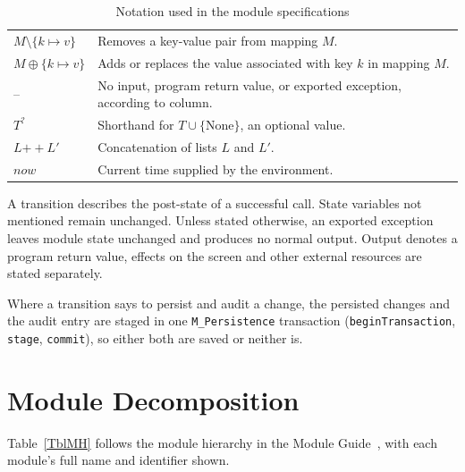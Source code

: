 \documentclass[12pt, titlepage]{article}
\begin{document}
\begin{table}[H]
\begin{tabularx}{\textwidth}{l X}
$M\setminus\{k\mapsto v\}$ & Removes a key-value pair from mapping $M$. \\
$M\oplus\{k\mapsto v\}$ & Adds or replaces the value associated with key $k$ in mapping $M$. \\
-- & No input, program return value, or exported exception, according to column. \\
$T^{?}$ & Shorthand for $T\cup\{\text{None}\}$, an optional value. \\
$L \mathbin{+\!\!+} L'$ & Concatenation of lists $L$ and $L'$. \\
$\mathit{now}$ & Current time supplied by the environment. \\
\bottomrule
\end{tabularx}
\caption{Notation used in the module specifications}
\label{TblNotation}
\end{table}

A transition describes the post-state of a successful call.
State variables not mentioned remain unchanged.
Unless stated otherwise, an exported exception leaves module state unchanged and produces no normal output.
Output denotes a program return value, effects on the screen and other external resources are stated separately.

Where a transition says to persist and audit a change, the persisted changes and
the audit entry are staged in one \texttt{M\_Persistence} transaction
(\texttt{beginTransaction}, \texttt{stage}, \texttt{commit}), so either both are saved or neither is.

\newpage

\section{Module Decomposition}

Table~\ref{TblMH} follows the module hierarchy in the Module Guide~\citep{MG},
with each module's full name and identifier shown.
\end{document}
